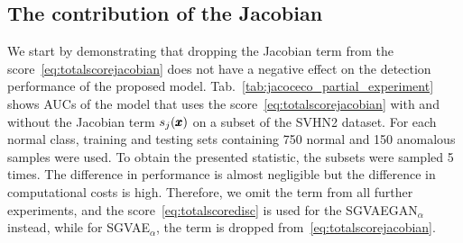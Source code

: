 \subsection{The contribution of the Jacobian} \label{sec:jacobian_contribution}

We start by demonstrating that dropping the Jacobian term from the score~\eqref{eq:totalscorejacobian} does not have a negative effect on the detection performance of the proposed model. Tab.~\ref{tab:jacoceco_partial_experiment} shows AUCs of the model that uses the score~\eqref{eq:totalscorejacobian} with and without the Jacobian term $s_j(\pmb{{x}})$ on a subset of the SVHN2 dataset. For each normal class, training and testing sets containing 750 normal and 150 anomalous samples were used. To obtain the presented statistic, the subsets were sampled 5 times.  The difference in performance is almost negligible but the difference in computational costs is high. Therefore, we omit the term from all further experiments, and the score~\eqref{eq:totalscoredisc} is used for the SGVAEGAN$_{\alpha}$ instead, while for SGVAE$_\alpha$, the term is dropped from~\eqref{eq:totalscorejacobian}.

